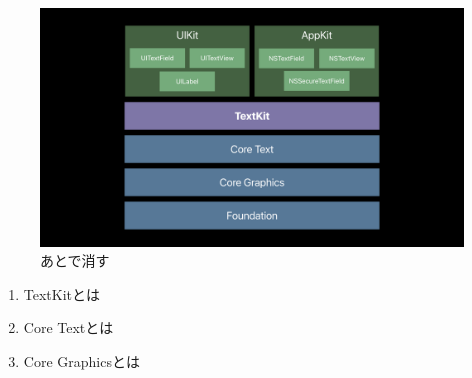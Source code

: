 \begin{figure}[htbp]
    \begin{center}
        \includegraphics[width=0.8\linewidth]{images/textKit_hierarchie.png}
    \end{center}
    \caption{あとで消す}
\end{figure}

\begin{enumerate}
    \item TextKitとは
    \item Core Textとは
    \item Core Graphicsとは
\end{enumerate}

